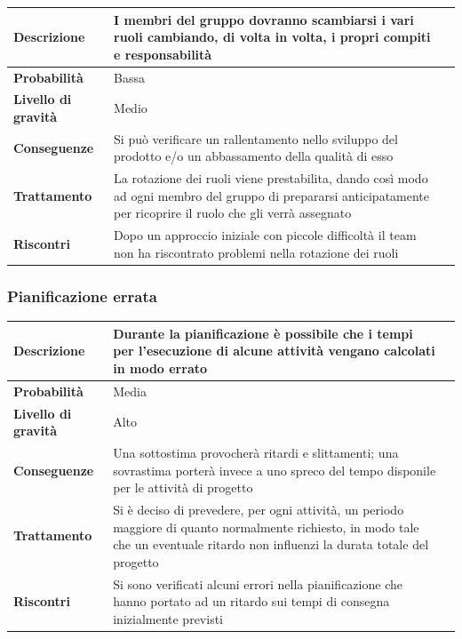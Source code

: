\begin{center}
	
	\begin{tabular}{|>{\centering}m{4cm} ||>{\centering}m{8cm} |>{\centering\arraybackslash}m{0pt}@{}|}
		\hline
		\textbf{Descrizione} & I membri del gruppo dovranno scambiarsi i vari ruoli cambiando, di volta in volta, i propri compiti e responsabilità & \\[2ex]
		\hline	
		\textbf{Probabilità} & Bassa &\\[1ex]
		\hline
		\textbf{Livello di gravità} & Medio & \\[1ex]
		\hline
		\textbf{Conseguenze} & Si può verificare un rallentamento nello sviluppo del prodotto e/o un abbassamento della qualità di esso & \\[1ex]
		\hline
		\textbf{Trattamento} & La rotazione dei ruoli viene prestabilita, dando così modo ad ogni membro del gruppo di prepararsi anticipatamente per ricoprire il ruolo che gli verrà assegnato & \\[1ex] 
		\hline
		\textbf{Riscontri} & Dopo un approccio iniziale con piccole difficoltà il team non ha riscontrato problemi nella rotazione dei ruoli  & \\[1ex]
		\hline
	\end{tabular}
	
\end{center}
\newpage
\subsubsection{Pianificazione errata}

\begin{center}
	
	\begin{tabular}{|>{\centering}m{4cm} ||>{\centering}m{8cm} |>{\centering\arraybackslash}m{0pt}@{}|}
		\hline
		\textbf{Descrizione} & Durante la pianificazione è possibile che i tempi per l’esecuzione di alcune attività vengano calcolati in modo errato & \\[2ex]
		\hline	
		\textbf{Probabilità} & Media &\\[1ex]
		\hline
		\textbf{Livello di gravità} & Alto & \\[1ex]
		\hline
		\textbf{Conseguenze} & Una sottostima provocherà ritardi e slittamenti; una sovrastima porterà invece a uno spreco del tempo disponile per le attività di progetto & \\[1ex]
		\hline
		\textbf{Trattamento} & Si è deciso di prevedere, per ogni attività, un periodo maggiore di quanto normalmente richiesto, in modo tale che un eventuale ritardo non influenzi la durata totale del progetto & \\[1ex] 
		\hline
		\textbf{Riscontri} & Si sono verificati alcuni errori nella pianificazione che hanno portato ad un ritardo sui tempi di consegna inizialmente previsti & \\[1ex]
		\hline
	\end{tabular}
	
\end{center}

